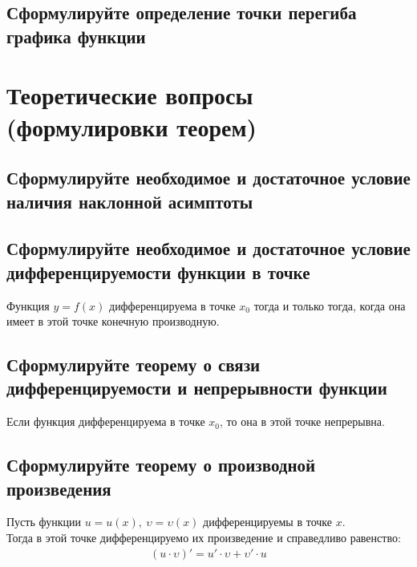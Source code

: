 \subsection{ Сформулируйте определение точки перегиба графика функции}
\begin{definition}

\end{definition}

\section{Теоретические вопросы (формулировки теорем)}

\subsection{Сформулируйте необходимое и достаточное условие наличия наклонной асимптоты}
\begin{theorem}

\end{theorem}

\subsection{Сформулируйте необходимое и достаточное условие дифференцируемости функции в точке}
\begin{theorem}
Функция $y=f(x)$ дифференцируема в точке $x_0$ тогда и только тогда, когда она имеет в этой точке конечную производную.
\end{theorem}

\subsection{Сформулируйте теорему о связи дифференцируемости и непрерывности функции}
\begin{theorem} 
Если функция дифференцируема в точке $x_0$, то она в этой точке непрерывна.
\end{theorem}

\subsection{Сформулируйте теорему о производной произведения}
\begin{theorem}
Пусть функции $u = u(x),\ \upsilon = \upsilon (x)$ дифференцируемы в точке $x$.\\
Тогда в этой точке дифференцируемо их произведение и справедливо равенство:
\begin{gather*}
(u \cdot \upsilon)' = u'\cdot \upsilon + \upsilon' \cdot u
\end{gather*}
\end{theorem}

